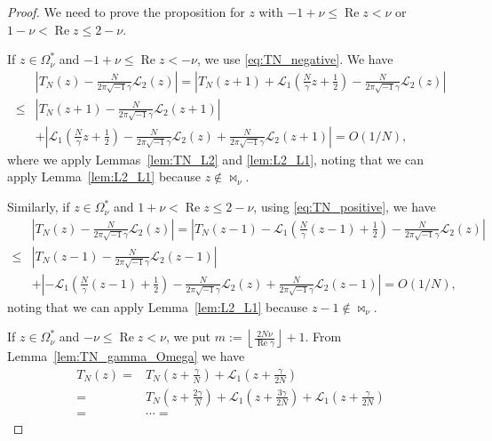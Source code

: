 \documentclass[10pt,a4paper]{amsart}
\renewcommand{\L}{\mathcal{L}}
\renewcommand{\Re}{\operatorname{Re}}
\renewcommand{\i}{\sqrt{-1}}
\begin{document}
\begin{proof}
We need to prove the proposition for $z$ with $-1+\nu\le\Re{z}<\nu$ or $1-\nu<\Re{z}\le2-\nu$.
\par
If $z\in\Omega^{\ast}_{\nu}$ and $-1+\nu\le\Re{z}<-\nu$, we use \eqref{eq:TN_negative}.
We have
\begin{align*}
  &\left|
    T_{N}(z)-\frac{N}{2\pi\i\gamma}\L_2(z)
  \right|
  =
  \left|
    T_{N}(z+1)
    +
    \L_1\left(\frac{N}{\gamma}z+\frac{1}{2}\right)
    -
    \frac{N}{2\pi\i\gamma}\L_2(z)
  \right|
  \\
  \le&
  \left|
    T_{N}(z+1)-\frac{N}{2\pi\i\gamma}\L_2(z+1)
  \right|
  \\
  &+
  \left|
    \L_1\left(\frac{N}{\gamma}z+\frac{1}{2}\right)
    -
    \frac{N}{2\pi\i\gamma}\L_2(z)
    +
    \frac{N}{2\pi\i\gamma}\L_2(z+1)
  \right|
  =
  O(1/N),
\end{align*}
where we apply Lemmas~\ref{lem:TN_L2} and \ref{lem:L2_L1}, noting that we can apply Lemma~\ref{lem:L2_L1} because $z\notin\bowtie_{\nu}$.
\par
Similarly, if $z\in\Omega^{\ast}_{\nu}$ and $1+\nu<\Re{z}\le2-\nu$, using \eqref{eq:TN_positive}, we have
\begin{align*}
  &\left|
    T_{N}(z)-\frac{N}{2\pi\i\gamma}\L_2(z)
  \right|
  =
  \left|
    T_{N}(z-1)
    -
    \L_1\left(\frac{N}{\gamma}(z-1)+\frac{1}{2}\right)
    -
    \frac{N}{2\pi\i\gamma}\L_2(z)
  \right|
  \\
  \le&
  \left|
    T_{N}(z-1)-\frac{N}{2\pi\i\gamma}\L_2(z-1)
  \right|
  \\
  &+
  \left|
    -\L_1\left(\frac{N}{\gamma}(z-1)+\frac{1}{2}\right)
    -
    \frac{N}{2\pi\i\gamma}\L_2(z)
    +
    \frac{N}{2\pi\i\gamma}\L_2(z-1)
  \right|
  =
  O(1/N),
\end{align*}
noting that we can apply Lemma~\ref{lem:L2_L1} because $z-1\notin\bowtie_{\nu}$.
\par
If $z\in\Omega^{\ast}_{\nu}$ and $-\nu\le\Re{z}<\nu$, we put $m:=\left\lfloor\frac{2N\nu}{\Re\gamma}\right\rfloor+1$.
From Lemma~\ref{lem:TN_gamma_Omega} we have
\begin{equation*}
\begin{split}
  T_{N}(z)
  =&
  T_{N}\left(z+\frac{\gamma}{N}\right)
  +
  \L_1\left(z+\frac{\gamma}{2N}\right)
  \\
  =&
  T_{N}\left(z+\frac{2\gamma}{N}\right)
  +
  \L_1\left(z+\frac{3\gamma}{2N}\right)
  +
  \L_1\left(z+\frac{\gamma}{2N}\right)
  \\
  =&\cdots
  =

\end{split}
\end{equation*}
\end{proof}
\end{document}
